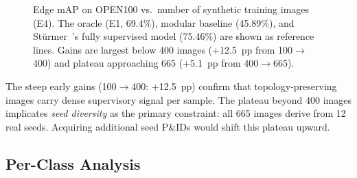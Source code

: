 \begin{figure}[t]
    \centering
    \caption{
        Edge mAP on OPEN100 vs.\ number of synthetic training images (E4).
        The oracle (E1, 69.4\%), modular baseline (45.89\%), and
        Stürmer~\etal's fully supervised model (75.46\%) are shown
        as reference lines.
        Gains are largest below 400 images (+12.5~pp from 100$\to$400)
        and plateau approaching 665 (+5.1~pp from 400$\to$665).
    }
    \label{fig:scale_ablation}
\end{figure}

The steep early gains (100$\to$400: +12.5~pp) confirm that
topology-preserving images carry dense supervisory signal per sample.
The plateau beyond 400 images implicates \emph{seed diversity} as the
primary constraint: all 665 \ours{} images derive from 12 real seeds.
Acquiring additional seed P\&IDs would shift this plateau upward.

\subsection{Per-Class Analysis}
\label{sec:exp:perclass}

